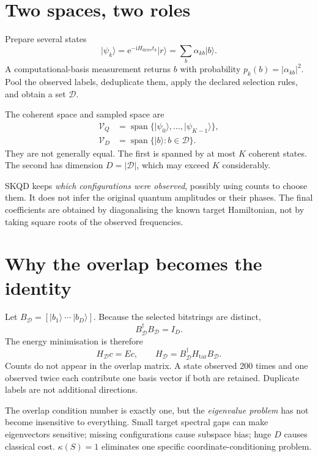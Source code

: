 \documentclass[11pt,a4paper,oneside]{report}
\newcommand{\ket}[1]{\lvert #1\rangle}
\newcommand{\abs}[1]{\left\lvert #1\right\rvert}
\newcommand{\Ht}{H_{\mathrm{tar}}}
\newcommand{\Hd}{H_{\mathrm{drive}}}
\newcommand{\HD}{H_{\mathcal D}}
\newcommand{\Dset}{\mathcal D}
\newcommand{\I}{\mathrm i}
\newcommand{\e}{\mathrm e}
\begin{document}
\section{Two spaces, two roles}
Prepare several states
\begin{equation}
\ket{\psi_k}=\e^{-\I\Hd t_k}\ket r
=\sum_b\alpha_{kb}\ket b.
\end{equation}
A computational-basis measurement returns $b$ with probability $p_k(b)=\abs{\alpha_{kb}}^2$. Pool the observed labels, deduplicate them, apply the declared selection rules, and obtain a set $\Dset$.

The coherent space and sampled space are
\begin{align}
\mathcal V_Q&=\operatorname{span}\{\ket{\psi_0},\ldots,\ket{\psi_{K-1}}\},\\
\mathcal V_D&=\operatorname{span}\{\ket b:b\in\Dset\}.
\end{align}
They are not generally equal. The first is spanned by at most $K$ coherent states. The second has dimension $D=\abs\Dset$, which may exceed $K$ considerably.

\begin{idea}
SKQD keeps \emph{which configurations were observed}, possibly using counts to choose them. It does not infer the original quantum amplitudes or their phases. The final coefficients are obtained by diagonalising the known target Hamiltonian, not by taking square roots of the observed frequencies.
\end{idea}

\section{Why the overlap becomes the identity}
Let $B_\Dset=[\ket{b_1}\ \cdots\ \ket{b_D}]$. Because the selected bitstrings are distinct,
\begin{equation}
B_\Dset^\dagger B_\Dset=I_D.
\end{equation}
The energy minimisation is therefore
\begin{equation}\label{eq:skqdRitz}
\boxed{\HD c=Ec,\qquad\HD=B_\Dset^\dagger\Ht B_\Dset.}
\end{equation}
Counts do not appear in the overlap matrix. A state observed 200 times and one observed twice each contribute one basis vector if both are retained. Duplicate labels are not additional directions.

The overlap condition number is exactly one, but the \emph{eigenvalue problem} has not become insensitive to everything. Small target spectral gaps can make eigenvectors sensitive; missing configurations cause subspace bias; huge $D$ causes classical cost. $\kappa(S)=1$ eliminates one specific coordinate-conditioning problem.
\end{document}
